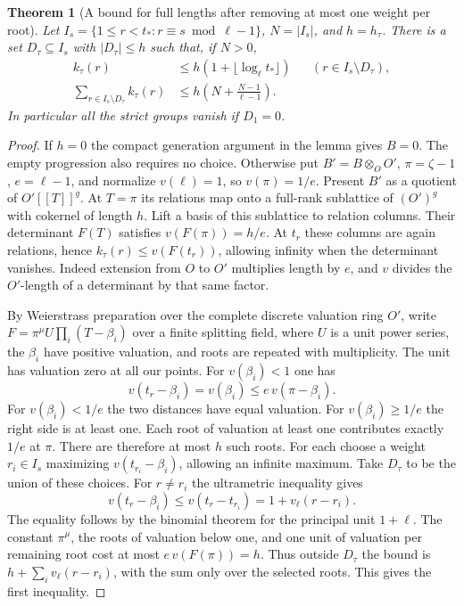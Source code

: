 \documentclass[a4paper,11pt]{article}
\newtheorem{theorem}[proposition]{Theorem}
\theoremstyle{definition}
\theoremstyle{remark}
\numberwithin{equation}{section}
\begin{document}
\begin{theorem}[A bound for full lengths after removing at most one weight per root]\leavevmode
\label{thm:splitweights502}
Let \(I_s=\{1\le r<t_*:r\equiv s\bmod{\ell-1}\}\), \(N=|I_s|\),
and \(h=h_\tau\). There is a set \(D_\tau\subseteq I_s\) with
\(|D_\tau|\le h\) such that, if \(N>0\),
\[
 \begin{aligned}
 k_\tau(r)&\le h(1+\lfloor\log_\ell t_*\rfloor)
                          &&(r\in I_s\setminus D_\tau),\\
 \sum_{r\in I_s\setminus D_\tau} k_\tau(r)
          &\le h\left(N+\frac{N-1}{\ell-1}\right).
 \end{aligned}
\]
In particular all the strict groups vanish if \(D_1=0\).
\end{theorem}
\begin{proof}
If \(h=0\) the compact generation argument in the lemma gives
\(B=0\). The empty progression also requires no choice. Otherwise
put \(B'=B\otimes_O O'\), \(\pi=\zeta-1\), \(e=\ell-1\), and
normalize \(v(\ell)=1\), so \(v(\pi)=1/e\). Present \(B'\)
as a quotient of \(O'[[T]]^g\). At \(T=\pi\) its relations map
onto a full-rank sublattice of \((O')^g\) with cokernel of
length \(h\). Lift a basis of this sublattice to relation columns.
Their determinant \(F(T)\) satisfies \(v(F(\pi))=h/e\).
At \(t_r\) these columns are again relations, hence
\(k_\tau(r)\le v(F(t_r))\), allowing infinity when the determinant
vanishes. Indeed extension from \(O\) to \(O'\) multiplies
length by \(e\), and \(v\) divides the \(O'\)-length of a
determinant by that same factor.

By Weierstrass preparation over the complete discrete valuation
ring \(O'\), write \(F=\pi^\mu U\prod_i(T-\beta_i)\) over a
finite splitting field, where \(U\) is a unit power series,
the \(\beta_i\) have positive valuation, and roots are repeated
with multiplicity. The unit has valuation zero at all our
points. For \(v(\beta_i)<1\) one has
\[
 v(t_r-\beta_i)=v(\beta_i)\le e\,v(\pi-\beta_i).
\]
For \(v(\beta_i)<1/e\) the two distances have equal valuation.
For \(v(\beta_i)\ge1/e\) the right side is at least one.
Each root of valuation at least one contributes exactly \(1/e\)
at \(\pi\). There are therefore at most \(h\) such roots.
For each choose a weight \(r_i\in I_s\) maximizing
\(v(t_{r_i}-\beta_i)\), allowing an infinite maximum. Take
\(D_\tau\) to be the union of these choices. For \(r\ne r_i\)
the ultrametric inequality gives
\[
 v(t_r-\beta_i)\le v(t_r-t_{r_i})=1+v_\ell(r-r_i).
\]
The equality follows by the binomial theorem for the principal
unit \(1+\ell\). The constant \(\pi^\mu\), the roots of
valuation below one, and one unit of valuation per remaining
root cost at most \(e\,v(F(\pi))=h\). Thus outside \(D_\tau\)
the bound is \(h+\sum_i v_\ell(r-r_i)\), with the sum only
over the selected roots. This gives the first inequality.


\end{proof}
\end{document}
